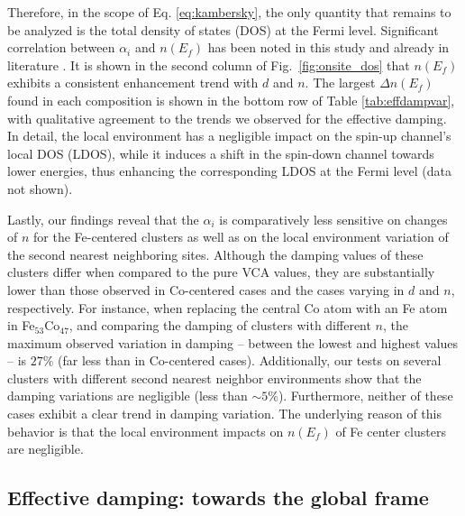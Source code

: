 Therefore, in the scope of Eq. \ref{eq:kambersky}, the only quantity that remains to be analyzed is the total density of states (DOS) at the Fermi level. 
Significant correlation between $\alpha_i$ and $n({E_f})$ has been noted in this study and already in literature \cite{PhysRevB.94.214410}. It is shown in the second column of Fig.~\ref{fig:onsite_dos} that $n({E_f})$ exhibits a consistent enhancement trend with $d$ and $n$. The largest $\Delta n({E_f})$ found in each composition is shown in the bottom row of Table \ref{tab:effdampvar}, with qualitative agreement to the trends we observed for the effective damping. In detail, the local environment has a negligible impact on the spin-up channel's local DOS (LDOS), while it induces a shift in the spin-down channel towards lower energies, thus enhancing the corresponding LDOS at the Fermi level (data not shown).


Lastly, our findings reveal that the $\alpha_i$ is comparatively less sensitive on changes of $n$ for the Fe-centered clusters as well as on the local environment variation of the second nearest neighboring sites. Although the damping values of these clusters differ when compared to the pure VCA values, they are substantially lower than those observed in Co-centered cases and the cases varying in $d$ and $n$, respectively. For instance, when replacing the central Co atom with an Fe atom in Fe$_{53}$Co$_{47}$, and comparing the damping of clusters with different $n$, the maximum observed variation in damping – between the lowest and highest values – is $27\%$ (far less than in Co-centered cases). Additionally, our tests on several clusters with different second nearest neighbor environments show that the damping variations are negligible (less than $\sim5\%$). Furthermore, neither of these cases exhibit a clear trend in damping variation.
The underlying reason of this behavior is that the local environment impacts on $n({E_f})$ of Fe center clusters are negligible.

\subsection{Effective damping: towards the global frame}

\label{sec:global-perspective}

